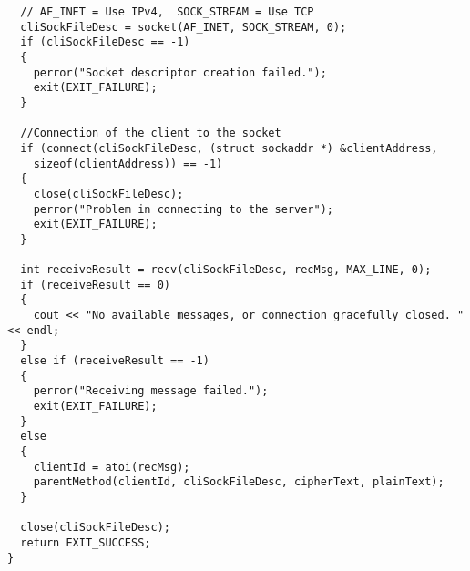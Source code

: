 \documentclass[11pt]{article}
\begin{document}
\begin{verbatim}
  // AF_INET = Use IPv4,  SOCK_STREAM = Use TCP
  cliSockFileDesc = socket(AF_INET, SOCK_STREAM, 0);
  if (cliSockFileDesc == -1)
  {
    perror("Socket descriptor creation failed.");
    exit(EXIT_FAILURE);
  }

  //Connection of the client to the socket
  if (connect(cliSockFileDesc, (struct sockaddr *) &clientAddress,
    sizeof(clientAddress)) == -1)
  {
    close(cliSockFileDesc);
    perror("Problem in connecting to the server");
    exit(EXIT_FAILURE);
  }

  int receiveResult = recv(cliSockFileDesc, recMsg, MAX_LINE, 0);
  if (receiveResult == 0)
  {
    cout << "No available messages, or connection gracefully closed. " << endl;
  }
  else if (receiveResult == -1)
  {
    perror("Receiving message failed.");
    exit(EXIT_FAILURE);
  }
  else
  {
    clientId = atoi(recMsg);
    parentMethod(clientId, cliSockFileDesc, cipherText, plainText);
  }

  close(cliSockFileDesc);
  return EXIT_SUCCESS;
}

\end{verbatim}
\end{document}
